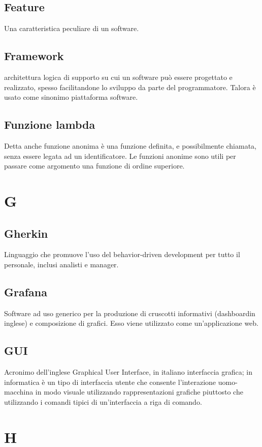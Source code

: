 \subsection*{Feature}
Una caratteristica peculiare di un software.

\subsection*{Framework}
architettura logica di supporto su cui un software può essere progettato e realizzato, spesso facilitandone lo sviluppo da parte del programmatore. Talora è usato come sinonimo piattaforma software.

\subsection*{Funzione lambda}
Detta anche funzione anonima è una funzione definita, e possibilmente chiamata, senza essere legata ad un identificatore. Le funzioni anonime sono utili per passare come argomento una funzione di ordine superiore.


\section*{G}
\subsection*{Gherkin}
Linguaggio che promuove l'uso del behavior-driven development per tutto il personale, inclusi analisti e manager.

\subsection*{Grafana}
Software ad uso generico per la produzione di cruscotti informativi (dashboard\glosp in inglese) e composizione di grafici. Esso viene utilizzato come un'applicazione web.

\subsection*{GUI}
Acronimo dell'inglese Graphical User Interface, in italiano interfaccia grafica; in informatica è un tipo di interfaccia utente che consente l'interazione uomo-macchina in modo visuale utilizzando rappresentazioni grafiche piuttosto che utilizzando i comandi tipici di un'interfaccia a riga di comando.

\section*{H}

